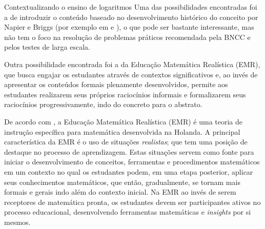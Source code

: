 \begin{apresentacao}{Contextualizando o ensino de logaritmos}
Uma das possibilidades encontradas foi a de introduzir o conteúdo baseado no desenvolvimento histórico do conceito por Napier e Briggs (por exemplo em \cite{Pedrosa2018} e \cite{Panagiotou2011}), o que pode ser bastante interessante, mas não tem o foco na resolução de problemas práticos recomendada pela BNCC e pelos testes de larga escala.

Outra possibilidade encontrada foi a da Educação Matemática Realística (EMR), que busca engajar os estudantes através de contextos significativos e, ao invés de apresentar os conteúdos formais plenamente desenvolvidos, permite aos estudantes realizarem seus próprios raciocínios informais e formalizarem seus raciocínios progressivamente, indo do concreto para o abstrato.

De acordo com  \cite{HeuvelPanhuizen}, a Educação Matemática Realística (EMR) é uma teoria de instrução específica para matemática desenvolvida na Holanda. A principal característica da EMR é o uso de situações \textit{realistas}; que tem uma posição de destaque no processo de aprendizagem. Estas situações servem como fonte para iniciar o desenvolvimento de conceitos, ferramentas e procedimentos matemáticos em um contexto no qual os estudantes podem, em uma etapa posterior, aplicar seus conhecimentos matemáticos, que então, gradualmente, se tornam mais formais e gerais indo além do contexto inicial. Na EMR ao invés de serem receptores de matemática pronta, os estudantes devem ser participantes ativos no processo educacional, desenvolvendo ferramentas matemáticas e \textit{insights} por si mesmos.


\end{apresentacao}
